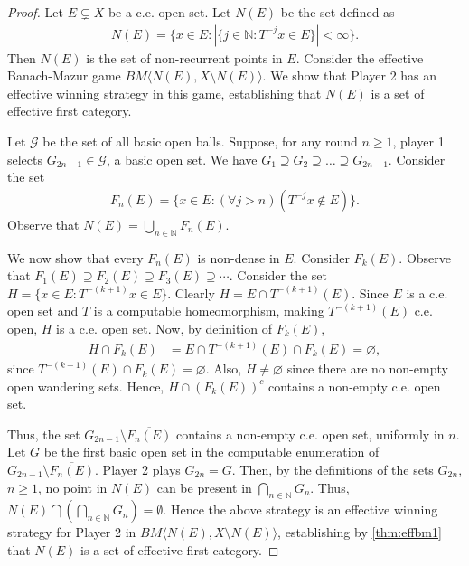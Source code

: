 \documentclass[a4paper,UKenglish,autoref,thm-restate,numberwithinsect]{lipics-v2021}
\newcommand{\N}{\mathbb{N}}
\begin{document}
\begin{proof}
	Let $E\subsetneq X$ be a c.e. open set. Let $N(E)$ be the set defined as 
	\begin{align*}
		N(E) = \{x \in E :\left|\{j \in \N: T^{-j}x \in	E\}\right| < \infty\}. 
	\end{align*} 
	Then $N(E)$ is the set of non-recurrent points in $E$. Consider the effective Banach-Mazur game $BM\langle N(E), X\setminus N(E)\rangle$. We show that Player 2 has an effective winning	strategy in this game, establishing that $N(E)$ is a set of effective first category.
	
	Let $\mathcal{G}$ be the set of all basic open balls. Suppose, for any round $n \ge 1$, player 1 selects $G_{2n-1}\in\mathcal{G}$, a basic open set. We have $G_1 \supseteq G_2 \supseteq \dots \supseteq G_{2n-1}$. Consider the set 
	\begin{align*}
		F_n(E) = \{x \in E : (\forall j > n)(T^{-j}x \notin	E)\}. 
	\end{align*}
	Observe that $N(E)=\bigcup_{n\in\mathbb{N}}F_n(E)$. 
	
	We now show that every $F_n(E)$ is non-dense in $E$. Consider $F_k(E)$. Observe that $F_1(E)\supseteq F_2(E)\supseteq F_3(E)\supseteq\cdots$. Consider the set $H=\{x\in E:T^{-(k+1)}x\in E\}$. Clearly $H=E\cap T^{-(k+1)}(E)$. Since $E$ is a c.e. open set and $T$ is a computable homeomorphism, making $T^{-(k+1)}(E)$ c.e. open, $H$ is a c.e. open set. Now, by definition of $F_k(E)$, 
	\begin{align*}
		H\cap F_k(E)&=E\cap T^{-(k+1)}(E)\cap F_k(E)=\varnothing, 
	\end{align*}
	since $T^{-(k+1)}(E)\cap F_k(E)=\varnothing$. Also, $H\ne\varnothing$ since there are no non-empty open wandering sets. Hence, $H\cap(F_k(E))^c$ contains a non-empty c.e. open set. 
	
	Thus, the set $G_{2n-1} \setminus \overline{F_n(E)}$ contains a non-empty c.e. open set, uniformly in $n$. Let $G$ be the first basic open set in the computable enumeration of $G_{2n-1} \setminus \overline{F_n(E)}$. Player 2 plays $G_{2n}=G$. Then, by the definitions of the sets	$G_{2n}$, $n \ge 1$, no point in $N(E)$ can be present in $\bigcap_{n\in\N} G_n$. Thus, $N(E) \bigcap \left(\bigcap_{n\in\N} G_n\right) = \emptyset$. Hence the above strategy is an effective winning strategy for Player 2 in $BM\langle N(E),X\setminus N(E)\rangle$, establishing by \cref{thm:effbm1} that $N(E)$ is a set of effective first category. 
\end{proof}
\end{document}
